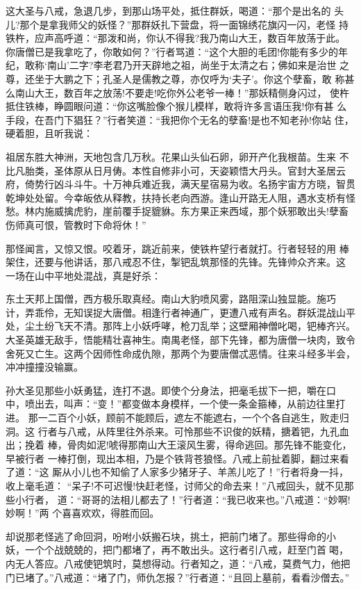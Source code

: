 这大圣与八戒，急退几步，到那山场平处，抵住群妖，喝道：“那个是出名的
头儿?那个是拿我师父的妖怪？”那群妖扎下营盘，将一面锦绣花旗闪一闪，老怪
持铁杵，应声高呼道：“那泼和尚，你认不得我?我乃南山大王，数百年放荡于此。
你唐僧已是我拿吃了，你敢如何？”行者骂道：“这个大胆的毛团!你能有多少的年
纪，敢称‘南山’二字?李老君乃开天辟地之祖，尚坐于太清之右；佛如来是治世
之尊，还坐于大鹏之下；孔圣人是儒教之尊，亦仅呼为‘夫子’。你这个孽畜，敢
称甚么南山大王，数百年之放荡!不要走!吃你外公老爷一棒！”那妖精侧身闪过，
使杵抵住铁棒，睁圆眼问道：“你这嘴脸像个猴儿模样，敢将许多言语压我!你有甚
么手段，在吾门下猖狂？”行者笑道：“我把你个无名的孽畜!是也不知老孙!你站
住，硬着胆，且听我说：

祖居东胜大神洲，天地包含几万秋。花果山头仙石卵，卵开产化我根苗。生来
不比凡胎类，圣体原从日月俦。本性自修非小可，天姿颖悟大丹头。官封大圣居云
府，倚势行凶斗斗牛。十万神兵难近我，满天星宿易为收。名扬宇宙方方晓，智贯
乾坤处处留。今幸皈依从释教，扶持长老向西游。逢山开路无人阻，遇水支桥有怪
愁。林内施威擒虎豹，崖前覆手捉貔貅。东方果正来西域，那个妖邪敢出头!孽畜
伤师真可恨，管教时下命将休！”

那怪闻言，又惊又恨。咬着牙，跳近前来，使铁杵望行者就打。行者轻轻的用
棒架住，还要与他讲话，那八戒忍不住，掣钯乱筑那怪的先锋。先锋帅众齐来。这
一场在山中平地处混战，真是好杀：

东土天邦上国僧，西方极乐取真经。南山大豹喷风雾，路阻深山独显能。施巧
计，弄乖伶，无知误捉大唐僧。相逢行者神通广，更遭八戒有声名。群妖混战山平
处，尘土纷飞天不清。那阵上小妖呼哮，枪刀乱举；这壁厢神僧叱喝，钯棒齐兴。
大圣英雄无敌手，悟能精壮喜神生。南禺老怪，部下先锋，都为唐僧一块肉，致令
舍死又亡生。这两个因师性命成仇隙，那两个为要唐僧忒恶情。往来斗经多半会，
冲冲撞撞没输赢。

孙大圣见那些小妖勇猛，连打不退。即使个分身法，把毫毛拔下一把，嚼在口
中，喷出去，叫声：“变！”都变做本身模样，一个使一条金箍棒，从前边往里打进。
那一二百个小妖，顾前不能顾后，遮左不能遮右，一个个各自逃生，败走归洞。这
行者与八戒，从阵里往外杀来。可怜那些不识俊的妖精，搪着钯，九孔血出；挽着
棒，骨肉如泥!唬得那南山大王滚风生雾，得命逃回。那先锋不能变化，早被行者
一棒打倒，现出本相，乃是个铁背苍狼怪。八戒上前扯着脚，翻过来看了道：“这
厮从小儿也不知偷了人家多少猪牙子、羊羔儿吃了！”行者将身一抖，收上毫毛道：
“呆子!不可迟慢!快赶老怪，讨师父的命去来！”八戒回头，就不见那些小行者，
道：“哥哥的法相儿都去了！”行者道：“我已收来也。”八戒道：“妙啊!妙啊！”两
个喜喜欢欢，得胜而回。

却说那老怪逃了命回洞，吩咐小妖搬石块，挑土，把前门堵了。那些得命的小
妖，一个个战兢兢的，把门都堵了，再不敢出头。这行者引八戒，赶至门首喝，
内无人答应。八戒使钯筑时，莫想得动。行者知之，道：“八戒，莫费气力，他把
门已堵了。”八戒道：“堵了门，师仇怎报？”行者道：“且回上墓前，看看沙僧去。”

